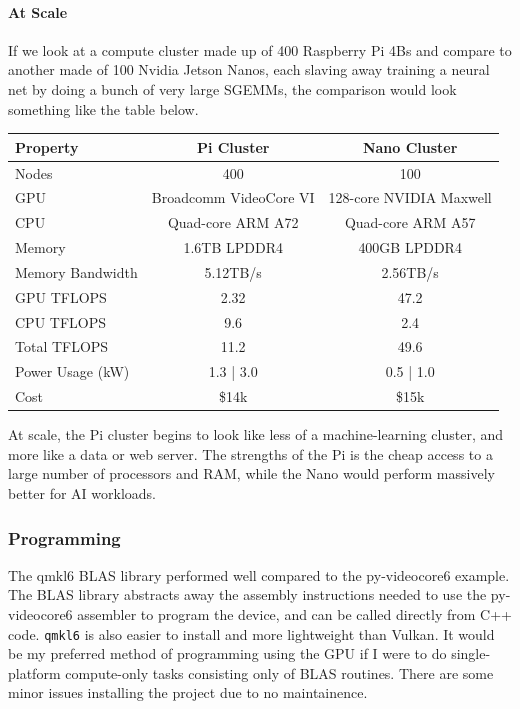 \documentclass[12pt]{article}
\begin{document}
\paragraph{At Scale}
If we look at a compute cluster made up of 400 Raspberry Pi 4Bs and compare to another made of 100 Nvidia Jetson Nanos, each slaving away training a neural net by doing a bunch of very large SGEMMs, the comparison would look something like the table below.

\begin{center}
\begin{tabular}{|l|c|c|}
\hline
Property & Pi Cluster & Nano Cluster \\
\hline
Nodes & 400 & 100 \\
\hline
GPU & Broadcomm VideoCore VI & 128-core NVIDIA Maxwell \\
\hline
CPU & Quad-core ARM A72 & Quad-core ARM A57  \\
\hline
Memory & 1.6TB LPDDR4 & 400GB LPDDR4 \\
\hline
Memory Bandwidth & 5.12TB/s & 2.56TB/s \\
\hline
GPU TFLOPS & 2.32 & 47.2 \\
\hline
CPU TFLOPS & 9.6 & 2.4\\
\hline
Total TFLOPS & 11.2 & 49.6\\
\hline
Power Usage (kW) & 1.3 | 3.0 & 0.5 | 1.0 \\
\hline
Cost & \$14k & \$15k \\
\hline
\end{tabular}
\end{center}

At scale, the Pi cluster begins to look like less of a machine-learning cluster, and more like a data or web server. The strengths of the Pi is the cheap access to a large number of processors and RAM, while the Nano would perform massively better for AI workloads.

\subsubsection{Programming}
The qmkl6 BLAS library performed well compared to the py-videocore6 example. The BLAS library abstracts away the assembly instructions needed to use the py-videocore6 assembler to program the device, and can be called directly from C++ code. \verb|qmkl6| is also easier to install and more lightweight than Vulkan. It would be my preferred method of programming using the GPU if I were to do single-platform compute-only tasks consisting only of BLAS routines. There are some minor issues installing the project due to no maintainence.
\end{document}
